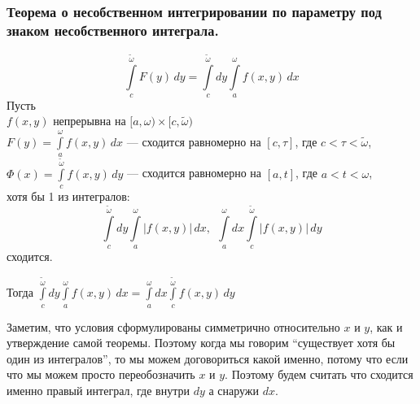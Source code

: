 \subsubsection{Теорема о несобственном интегрировании по параметру под знаком несобственного интеграла.}
\[ \int\limits_c^{\tilde \omega} F(y)\,dy = \int\limits_c^{\tilde \omega} dy \int\limits_a^{\omega} f(x, y)\,dx \]
Пусть \\
\phantom{Пусть} $f(x, y)$ непрерывна на $[a, \omega) \times [c, \tilde \omega)$ \\
\phantom{Пусть} $F(y) = \int\limits_a^{\omega} f(x, y)\,dx$ --- сходится равномерно на $[c, \tau]$, 
где $c < \tau < \tilde \omega$, \\
\phantom{Пусть} $\Phi(x) = \int\limits_c^{\tilde \omega} f(x, y)\,dy$ --- сходится равномерно на $[a, t]$, 
где $a < t < \omega$, \\
\phantom{Пусть} хотя бы 1 из интегралов:
\[ \int\limits_c^{\tilde \omega} dy \int\limits_a^{\omega} |f(x, y)|\,dx, \ \ 
\int\limits_a^{\omega} dx \int\limits_c^{\tilde \omega} |f(x, y)|\,dy \]
\phantom{Пусть} сходится.

Тогда $\int\limits_c^{\tilde \omega} dy \int\limits_a^{\omega} f(x, y)\,dx = 
\int\limits_a^{\omega} dx \int\limits_c^{\tilde \omega} f(x, y)\,dy$

Заметим, что условия сформулированы симметрично относительно $x$ и $y$, как и 
утверждение самой теоремы. Поэтому когда мы говорим ``существует хотя бы один из интегралов'',
то мы можем договориться какой именно, потому что если что мы можем просто переобозначить
$x$ и $y$. Поэтому будем считать что сходится именно правый интеграл, где внутри 
$dy$ а снаружи $dx$.

